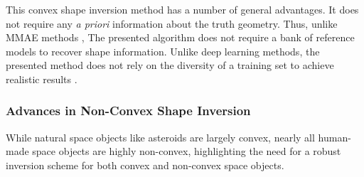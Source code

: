 This convex shape inversion method has a number of general advantages. It does not require any \textit{a priori} information about the truth geometry. Thus, unlike MMAE methods \cite{linares2014space}, The presented algorithm does not require a bank of reference models to recover shape information. Unlike deep learning methods, the presented method does not rely on the diversity of a training set to achieve realistic results \cite{furfaro2019,kerr2021}.

\subsubsection{Advances in Non-Convex Shape Inversion}

While natural space objects like asteroids are largely convex, nearly all human-made space objects are highly non-convex, highlighting the need for a robust inversion scheme for both convex and non-convex space objects.